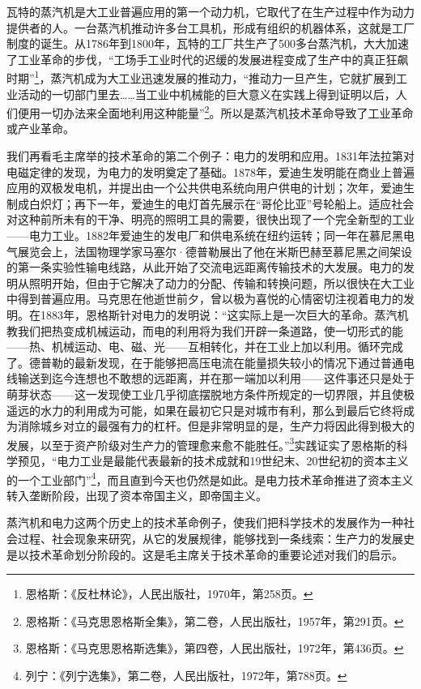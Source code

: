 瓦特的蒸汽机是大工业普遍应用的第一个动力机，它取代了在生产过程中作为动力提供者的人。一台蒸汽机推动许多台工具机，形成有组织的机器体系，这就是工厂制度的诞生。从1786年到1800年，瓦特的工厂共生产了500多台蒸汽机，大大加速了工业革命的步伐，“工场手工业时代的迟缓的发展进程变成了生产中的真正狂飙时期”\footnote{恩格斯：《反杜林论》，人民出版社，1970年，第258页。}，蒸汽机成为大工业迅速发展的推动力，“推动力一旦产生，它就扩展到工业活动的一切部门里去……当工业中机械能的巨大意义在实践上得到证明以后，人们便用一切办法来全面地利用这种能量”\footnote{恩格斯：《马克思恩格斯全集》，第二卷，人民出版社，1957年，第291页。}。所以是蒸汽机技术革命导致了工业革命或产业革命。

我们再看毛主席举的技术革命的第二个例子：电力的发明和应用。1831年法拉第对电磁定律的发现，为电力的发明奠定了基础。1878年，爱迪生发明能在商业上普遍应用的双极发电机，并提出由一个公共供电系统向用户供电的计划；次年，爱迪生制成白炽灯；再下一年，爱迪生的电灯首先展示在“哥伦比亚”号轮船上。适应社会对这种前所未有的干净、明亮的照明工具的需要，很快出现了一个完全新型的工业——电力工业。1882年爱迪生的发电厂和供电系统在纽约运转；同一年在慕尼黑电气展览会上，法国物理学家马塞尔·德普勒展出了他在米斯巴赫至慕尼黑之间架设的第一条实验性输电线路，从此开始了交流电远距离传输技术的大发展。电力的发明从照明开始，但由于它解决了动力的分配、传输和转换问题，所以很快在大工业中得到普遍应用。马克思在他逝世前夕，曾以极为喜悦的心情密切注视着电力的发明。在1883年，恩格斯针对电力的发明说：“这实际上是一次巨大的革命。蒸汽机教我们把热变成机械运动，而电的利用将为我们开辟一条道路，使一切形式的能——热、机械运动、电、磁、光——互相转化，并在工业上加以利用。循环完成了。德普勒的最新发现，在于能够把高压电流在能量损失较小的情况下通过普通电线输送到迄今连想也不敢想的远距离，并在那一端加以利用——这件事还只是处于萌芽状态——这一发现使工业几乎彻底摆脱地方条件所规定的一切界限，并且使极遥远的水力的利用成为可能，如果在最初它只是对城市有利，那么到最后它终将成为消除城乡对立的最强有力的杠杆。但是非常明显的是，生产力将因此得到极大的发展，以至于资产阶级对生产力的管理愈来愈不能胜任。”\footnote{恩格斯：《马克思恩格斯选集》，第四卷，人民出版社，1972年，第436页。}实践证实了恩格斯的科学预见，“电力工业是最能代表最新的技术成就和19世纪末、20世纪初的资本主义的一个工业部门”\footnote{列宁：《列宁选集》，第二卷，人民出版社，1972年，第788页。}，而且直到今天也仍然是如此。是电力技术革命推进了资本主义转入垄断阶段，出现了资本帝国主义，即帝国主义。

蒸汽机和电力这两个历史上的技术革命例子，使我们把科学技术的发展作为一种社会过程、社会现象来研究，从它的发展规律，能够找到一条线索：生产力的发展史是以技术革命划分阶段的。这是毛主席关于技术革命的重要论述对我们的启示。

